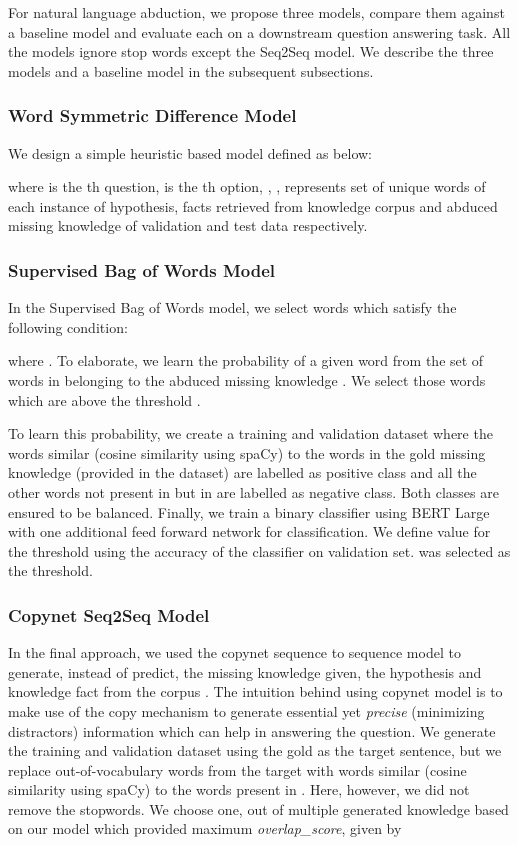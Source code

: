 \documentclass[11pt,a4paper]{article}
\begin{document}
For natural language abduction, we propose three models, compare them against a baseline model and evaluate each on a downstream question answering task. All the models ignore stop words except the Seq2Seq model. We describe the three models and a baseline model in the subsequent subsections.


\subsubsection{Word Symmetric Difference Model}
We design a simple heuristic based model defined as below:

where  is the th question,  is the th option, , ,  represents set of unique words of each instance of hypothesis, facts retrieved from knowledge corpus  and abduced missing knowledge of validation and test data respectively.
\subsubsection{Supervised Bag of Words Model}
In the Supervised Bag of Words model, we select words which satisfy the following condition: 

where . To elaborate, we learn the probability of a given word  from the set of words in  belonging to the abduced missing knowledge . We select those words which are above the threshold .

To learn this probability, we create a training and validation dataset where the words similar (cosine similarity using spaCy) \cite{spacy2} to the words in the gold missing knowledge  (provided in the dataset) are labelled as positive class and all the other words not present in  but in  are labelled as negative class.  Both classes are ensured to be balanced. Finally, we train a binary classifier using BERT Large with one additional feed forward network for classification. We define value for the threshold  using the accuracy of the classifier on validation set.  was selected as the threshold.



\subsubsection{Copynet Seq2Seq Model}
In the final approach, we used the copynet sequence to sequence model \cite{P16-1154} to generate, instead of predict, the missing knowledge given, the hypothesis  and knowledge fact from the corpus . The intuition behind using copynet model is to make use of the copy mechanism to generate essential yet \textit{precise} (minimizing distractors) information which can help in answering the question.
We generate the training and validation dataset using the gold  as the target sentence, but we replace out-of-vocabulary words from the target with words similar (cosine similarity using spaCy) \cite{spacy2} to the words present in . Here, however, we did not remove the stopwords.
We choose one, out of multiple generated knowledge based on our model which provided maximum \textit{overlap\_score}, given by
\end{document}
